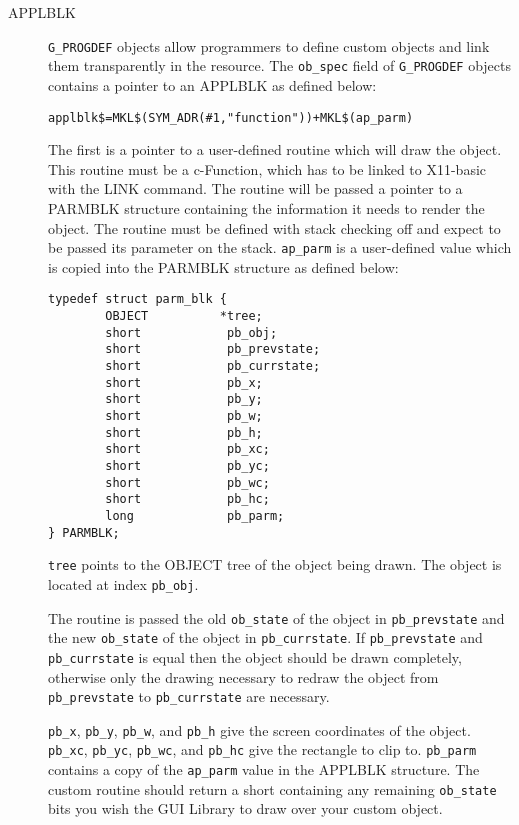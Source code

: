 \begin{description}
\begin{description}
\item[APPLBLK]

\verb|G_PROGDEF| objects allow programmers to define custom objects and link
them transparently in the resource. The \verb|ob_spec| field of
\verb|G_PROGDEF|
objects contains a pointer to an APPLBLK as defined below:

 {\footnotesize
\begin{verbatim}                                                         
applblk$=MKL$(SYM_ADR(#1,"function"))+MKL$(ap_parm)
\end{verbatim}}

The first is a pointer to a user-defined routine which will draw the
object. This routine must be a c-Function, which has to be linked to 
X11-basic with the LINK command. The routine will be passed a pointer to a
PARMBLK structure containing the information it needs to render the
object. The routine must be defined with stack checking off and expect
to be passed its parameter on the stack. \verb|ap_parm| is a user-defined
value which is copied into the PARMBLK structure as defined below:

{\footnotesize
\begin{verbatim}                                                         
typedef struct parm_blk {
        OBJECT          *tree;
        short            pb_obj;
        short            pb_prevstate;
        short            pb_currstate;
        short            pb_x;
        short            pb_y;
        short            pb_w;
        short            pb_h;
        short            pb_xc;
        short            pb_yc;
        short            pb_wc;
        short            pb_hc;
        long             pb_parm;
} PARMBLK;
\end{verbatim}}

\verb|tree| points to the OBJECT tree of the object being drawn. The object
is located at index \verb|pb_obj|.

The routine is passed the old \verb|ob_state| of the object in
\verb|pb_prevstate|
and the new \verb|ob_state| of the object in \verb|pb_currstate|. 
If \verb|pb_prevstate|
and \verb|pb_currstate| is equal then the object should be drawn completely,
otherwise only the drawing necessary to redraw the object from
\verb|pb_prevstate| to \verb|pb_currstate| are necessary.

\verb|pb_x|, \verb|pb_y|, \verb|pb_w|, and \verb|pb_h| give the screen 
coordinates of the object.
\verb|pb_xc|, \verb|pb_yc|, \verb|pb_wc|, and \verb|pb_hc| give the 
rectangle to clip to. \verb|pb_parm|
contains a copy of the \verb|ap_parm| value in the APPLBLK structure.
The custom routine should return a short containing any remaining
\verb|ob_state| bits you wish the GUI Library to draw over your custom object.

\end{description}

\end{description}
